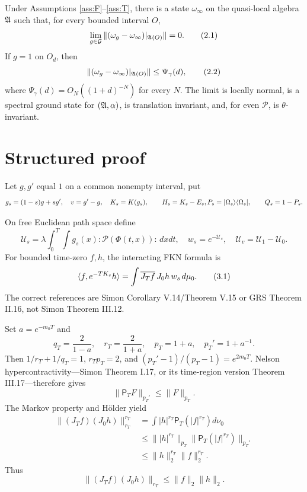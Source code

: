 \documentclass[11pt,a4paper]{article}
\begin{document}
\begin{theorem}\label{thm:main}
Under Assumptions \ref{ass:F}--\ref{ass:T}, there is a state $\omega_\infty$ on
the quasi-local algebra $\mathfrak A$ such that, for every bounded interval $O$,
\[
 \lim_{g\in\mathcal G}\| (\omega_g-\omega_\infty)|_{\mathfrak A(O)}\|=0.           \tag{2.1}
\]
If $g=1$ on $O_d$, then
\[
 \|(\omega_g-\omega_\infty)|_{\mathfrak A(O)}\|\leq\Psi_\gamma(d),         \tag{2.2}
\]
where $\Psi_\gamma(d)=O_N((1+d)^{-N})$ for every $N$.  The limit is locally
normal, is a spectral ground state for $(\mathfrak A,\alpha)$, is translation invariant,
and, for even $\mathscr P$, is $\theta$-invariant.
\end{theorem}

\section{Structured proof}


Let $g,g'$ equal $1$ on a common nonempty interval, put
\[
 g_s=(1-s)g+sg',\quad v=g'-g,\quad K_s=K(g_s),
 \qquad H_s=K_s-E_s,\\
 P_s=|\Omega_s\rangle\langle\Omega_s|,\qquad Q_s=1-P_s.
\]


\Because On free Euclidean path space define
\[
 \mathcal U_s=\lambda\int_0^T\!\int g_s(x){:}\mathscr P(\Phi(t,x)){:}\,dxdt,
 \quad w_s=e^{-\mathcal U_s},\quad \mathcal U_v=\mathcal U_1-\mathcal U_0.
\]
For bounded time-zero $f,h$, the interacting FKN formula is
\[
 \langle f,e^{-TK_s}h\rangle=\int\overline{J_Tf}\,J_0h\,w_s\,d\mu_0.        \tag{3.1}
\]
The correct references are Simon Corollary V.14/Theorem V.15 or GRS Theorem
II.16, not Simon Theorem III.12.

Set $a=e^{-m_0T}$ and
\[
 q_T=\frac2{1-a},\quad r_T=\frac2{1+a},\quad p_T=1+a,
 \quad p_T'=1+a^{-1}.
\]
Then $1/r_T+1/q_T=1$, $r_Tp_T=2$, and
$(p_T'-1)/(p_T-1)=e^{2m_0T}$.  Nelson hypercontractivity---Simon
Theorem I.17, or its time-region version Theorem III.17---therefore gives
\[
 \|\mathsf P_TF\|_{p_T'}\leq\|F\|_{p_T}.
\]
The Markov property and H\"older yield
\begin{align*}
 \|(J_Tf)(J_0h)\|_{r_T}^{r_T}
 &=\int |h|^{r_T}\mathsf P_T(|f|^{r_T})d\nu_0\\
 &\leq\||h|^{r_T}\|_{p_T}\|\mathsf P_T(|f|^{r_T})\|_{p_T'}\\
 &\leq\|h\|_2^{r_T}\|f\|_2^{r_T}.
\end{align*}
Thus
\[
 \|(J_Tf)(J_0h)\|_{r_T}\leq\|f\|_2\|h\|_2.                       \tag{3.2}
\]
\end{document}
